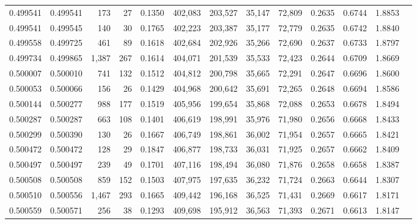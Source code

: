 \begin{tabular}{rrrrrrrrrrrrr}
0.499541 & 0.499541 &   173 &    27 &                                     0.1350 & 402,083 & 203,527 &  35,147 &  72,809 & 0.2635 & 0.6744 & 1.8853 \\
0.499541 & 0.499545 &   140 &    30 &                                     0.1765 & 402,223 & 203,387 &  35,177 &  72,779 & 0.2635 & 0.6742 & 1.8840 \\
0.499558 & 0.499725 &   461 &    89 &                                     0.1618 & 402,684 & 202,926 &  35,266 &  72,690 & 0.2637 & 0.6733 & 1.8797 \\
0.499734 & 0.499865 & 1,387 &   267 &                                     0.1614 & 404,071 & 201,539 &  35,533 &  72,423 & 0.2644 & 0.6709 & 1.8669 \\
0.500007 & 0.500010 &   741 &   132 &                                     0.1512 & 404,812 & 200,798 &  35,665 &  72,291 & 0.2647 & 0.6696 & 1.8600 \\
0.500053 & 0.500066 &   156 &    26 &                                     0.1429 & 404,968 & 200,642 &  35,691 &  72,265 & 0.2648 & 0.6694 & 1.8586 \\
0.500144 & 0.500277 &   988 &   177 &                                     0.1519 & 405,956 & 199,654 &  35,868 &  72,088 & 0.2653 & 0.6678 & 1.8494 \\
0.500287 & 0.500287 &   663 &   108 &                                     0.1401 & 406,619 & 198,991 &  35,976 &  71,980 & 0.2656 & 0.6668 & 1.8433 \\
0.500299 & 0.500390 &   130 &    26 &                                     0.1667 & 406,749 & 198,861 &  36,002 &  71,954 & 0.2657 & 0.6665 & 1.8421 \\
0.500472 & 0.500472 &   128 &    29 &                                     0.1847 & 406,877 & 198,733 &  36,031 &  71,925 & 0.2657 & 0.6662 & 1.8409 \\
0.500497 & 0.500497 &   239 &    49 &                                     0.1701 & 407,116 & 198,494 &  36,080 &  71,876 & 0.2658 & 0.6658 & 1.8387 \\
0.500508 & 0.500508 &   859 &   152 &                                     0.1503 & 407,975 & 197,635 &  36,232 &  71,724 & 0.2663 & 0.6644 & 1.8307 \\
0.500510 & 0.500556 & 1,467 &   293 &                                     0.1665 & 409,442 & 196,168 &  36,525 &  71,431 & 0.2669 & 0.6617 & 1.8171 \\
0.500559 & 0.500571 &   256 &    38 &                                     0.1293 & 409,698 & 195,912 &  36,563 &  71,393 & 0.2671 & 0.6613 & 1.8147 \\

\end{tabular}
